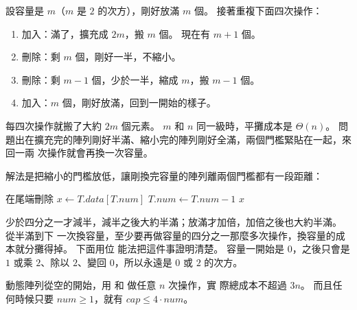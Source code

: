 設容量是 $m$（$m$ 是 $2$ 的次方），剛好放滿 $m$ 個。 接著重複下面四次操作：
\begin{enumerate}
\item 加入：滿了，擴充成 $2m$，搬 $m$ 個。 現在有 $m + 1$ 個。
\item 刪除：剩 $m$ 個，剛好一半，不縮小。
\item 刪除：剩 $m - 1$ 個，少於一半，縮成 $m$，搬 $m - 1$ 個。
\item 加入：$m$ 個，剛好放滿，回到一開始的樣子。
\end{enumerate}
每四次操作就搬了大約 $2m$ 個元素。 $m$ 和 $n$ 同一級時，平攤成本是 $\Theta(n)$。
問題出在擴充完的陣列剛好半滿、縮小完的陣列剛好全滿，兩個門檻緊貼在一起，來回一兩
次操作就會再換一次容量。

解法是把縮小的門檻放低，讓剛換完容量的陣列離兩個門檻都有一段距離：

\begin{pseudo}[label=alg:table-pop]{在尾端刪除}
    \State $x \gets T.\mathit{data}[T.\mathit{num}]$
    \State $T.\mathit{num} \gets T.\mathit{num} - 1$
        \State {} 
        \State {}
    \EndIf
    \State \Return $x$
\EndFunction
\end{pseudo}

少於四分之一才減半，減半之後大約半滿；放滿才加倍，加倍之後也大約半滿。 從半滿到下
一次換容量，至少要再做容量的四分之一那麼多次操作，換容量的成本就分攤得掉。 下面用位
能法把這件事證明清楚。 容量一開始是 $0$，之後只會是 $1$ 或乘 $2$、除以 $2$、變回
$0$，所以永遠是 $0$ 或 $2$ 的次方。

\begin{theorem}
\label{thm:dyn-array}
動態陣列從空的開始，用  和  做任意 $n$ 次操作，實
際總成本不超過 $3n$。 而且任何時候只要 $\mathit{num} \ge 1$，就有 $\mathit{cap} \le
4 \cdot \mathit{num}$。
\end{theorem}

